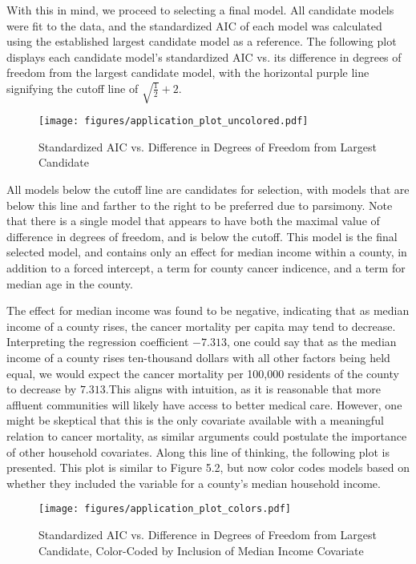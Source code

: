 		With this in mind, we proceed to selecting a final model. All candidate models were fit to the data, and the standardized AIC of each model was calculated
		using the established largest candidate model as a reference. The following plot displays each candidate model's standardized AIC vs. its difference in
		degrees of freedom from the largest candidate model, with the horizontal purple line signifying the cutoff line of $\sqrt{\frac{1}{2}} + 2$.

		\begin{figure}[H]
			\centering
			\captionsetup{justification=centering}
			\texttt{[image: figures/application\_plot\_uncolored.pdf]}
			\caption{\label{fig:app_stand_AIC_plot_no_colors} Standardized AIC vs. Difference in Degrees of Freedom from Largest Candidate}
		\end{figure}

		All models below the cutoff line are candidates for selection, with models that are below this line and farther to the right to be preferred due to parsimony. Note
		that there is a single model that appears to have both the maximal value of difference in degrees of freedom, and is below the cutoff. This model is the
		final selected model, and contains only an effect for median income within a county, in addition to a forced intercept, a term for county cancer indicence,
		and a term for median age in the county.
		
		The effect for median income was found to be negative, indicating that as median income of a county rises, the cancer mortality per capita may tend to
		decrease.  Interpreting the regression coefficient $-7.313$, one could say that as the median income of a county rises ten-thousand dollars with all other factors being
		held equal, we would expect the cancer mortality per 100,000 residents of the county to decrease by $7.313$.This aligns with intuition, as it is reasonable
		that more affluent communities will likely have access to better medical care. However, one might be skeptical that this is the only covariate available with a meaningful
		relation to cancer mortality, as similar arguments could postulate the importance of other household covariates. Along this line of thinking, the following plot
		is presented. This plot is similar to Figure 5.2, but now color codes models based on whether they included the variable for a county's median household income.

		\begin{figure}[H]
			\centering
			\captionsetup{justification=centering}
			\texttt{[image: figures/application\_plot\_colors.pdf]}
			\caption{\label{fig:app_stand_AIC_plot_colors} Standardized AIC vs. Difference in Degrees of Freedom from Largest Candidate,
			Color-Coded by Inclusion of Median Income Covariate}
		\end{figure}

